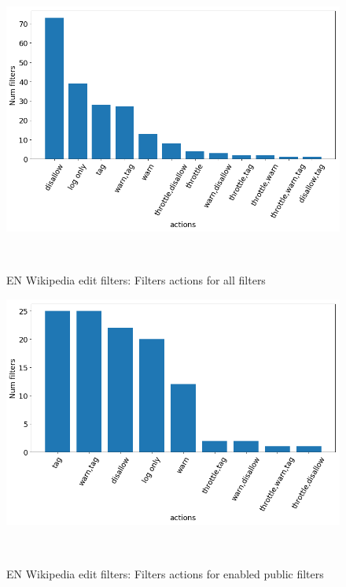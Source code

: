\begin{figure}
\centering
  \includegraphics[width=0.9\columnwidth]{pics/all-active-filters-actions.png}
  \caption{EN Wikipedia edit filters: Filters actions for all filters}~\label{fig:all-active-filters-actions}
\end{figure}


\begin{figure}
\centering
  \includegraphics[width=0.9\columnwidth]{pics/active-public-actions-big.png}
  \caption{EN Wikipedia edit filters: Filters actions for enabled public filters}~\label{fig:active-public-actions}
\end{figure}


